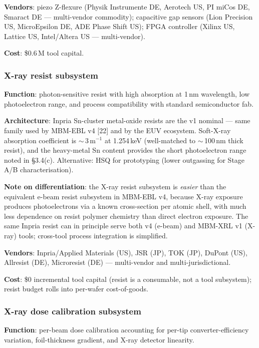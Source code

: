 \documentclass[11pt,letterpaper]{article}
\begin{document}
\textbf{Vendors}: piezo Z-flexure (Physik Instrumente DE, Aerotech US, PI miCos DE, Smaract DE --- multi-vendor commodity); capacitive gap sensors (Lion Precision US, MicroEpsilon DE, ADE Phase Shift US); FPGA controller (Xilinx US, Lattice US, Intel/Altera US --- multi-vendor).

\textbf{Cost}: \$0.6\,M tool capital.

\subsubsection{X-ray resist subsystem}

\textbf{Function}: photon-sensitive resist with high absorption at 1\,nm wavelength, low photoelectron range, and process compatibility with standard semiconductor fab.

\textbf{Architecture}: Inpria Sn-cluster metal-oxide resists are the v1 nominal --- same family used by MBM-EBL v4 [22] and by the EUV ecosystem. Soft-X-ray absorption coefficient is $\sim$\,3\,\textmu m$^{-1}$ at 1.254\,keV (well-matched to $\sim$\,100\,nm thick resist), and the heavy-metal Sn content provides the short photoelectron range noted in \S 3.4(c). Alternative: HSQ for prototyping (lower outgassing for Stage A/B characterisation).

\textbf{Note on differentiation}: the X-ray resist subsystem is \textit{easier} than the equivalent e-beam resist subsystem in MBM-EBL v4, because X-ray exposure produces photoelectrons via a known cross-section per atomic shell, with much less dependence on resist polymer chemistry than direct electron exposure. The same Inpria resist can in principle serve both v4 (e-beam) and MBM-XRL v1 (X-ray) tools; cross-tool process integration is simplified.

\textbf{Vendors}: Inpria/Applied Materials (US), JSR (JP), TOK (JP), DuPont (US), Allresist (DE), Microresist (DE) --- multi-vendor and multi-jurisdictional.

\textbf{Cost}: \$0 incremental tool capital (resist is a consumable, not a tool subsystem); resist budget rolls into per-wafer cost-of-goods.

\subsubsection{X-ray dose calibration subsystem}

\textbf{Function}: per-beam dose calibration accounting for per-tip converter-efficiency variation, foil-thickness gradient, and X-ray detector linearity.
\end{document}
